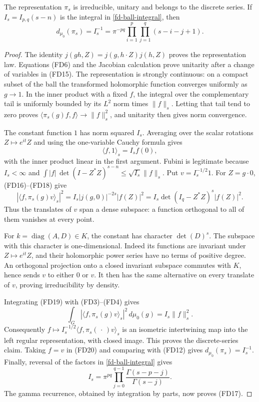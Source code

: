 \begin{lemma}\label{fd-scalar-model}
The representation $\pi_s$ is irreducible, unitary and
belongs to the discrete series. If
$I_s=I_{p,q}(s-n)$ is the integral in
\eqref{fd-ball-integral}, then
\[
                    d_{\mu_0}(\pi_s)=I_s^{-1}
                      =\pi^{-pq}
                        \prod_{i=1}^p\prod_{j=1}^q(s-i-j+1).
 \tag{FD17}\label{fd-scalar-degree}
\]
\end{lemma}
\begin{proof}
The identity
$j(gh,Z)=j(g,h\cdot Z)j(h,Z)$ proves the representation
law. Equations (FD6) and the Jacobian calculation prove
unitarity after a change of variables in (FD15).
The representation is strongly continuous: on a compact
subset of the ball the transformed holomorphic function
converges uniformly as $g\to1$. In the inner product with
a fixed $f$, the integral over the complementary tail is
uniformly bounded by its $L^2$ norm times $\|f\|_s$.
Letting that tail tend to zero proves
$\langle\pi_s(g)f,f\rangle\to\|f\|_s^2$, and unitarity
then gives norm convergence.

The constant function $1$ has norm squared $I_s$.
Averaging over the scalar rotations $Z\mapsto e^{it}Z$
and using the one-variable Cauchy formula gives
\[
                         \langle f,1\rangle_s=I_s f(0),
 \tag{FD18}
\]
with the inner product linear in the first argument.
Fubini is legitimate because $I_s<\infty$ and
$\int|f|\,\det(I-Z^*Z)^{s-n}\le\sqrt{I_s}\|f\|_s$.
Put $v=I_s^{-1/2}1$. For $Z=g\cdot0$, (FD16)--(FD18) give
\[
 |\langle f,\pi_s(g)v\rangle_s|^2
       =I_s|j(g,0)|^{-2s}|f(Z)|^2
       =I_s\det(I_q-Z^*Z)^s|f(Z)|^2.
 \tag{FD19}
\]
Thus the translates of $v$ span a dense subspace: a function
orthogonal to all of them vanishes at every point.

For $k=\operatorname{diag}(A,D)\in K$, the constant
has character $\det(D)^s$. The subspace with this
character is one-dimensional. Indeed its functions
are invariant under $Z\mapsto e^{it}Z$, and their
holomorphic power series have no terms of positive degree.
An orthogonal projection onto a closed invariant
subspace commutes with $K$, hence sends $v$ to either
$0$ or $v$. It then has the same alternative on every
translate of $v$, proving irreducibility by density.

Integrating (FD19) with (FD3)--(FD4) gives
\[
               \int_G|\langle f,\pi_s(g)v\rangle_s|^2\,d\mu_0(g)
                                  =I_s\|f\|_s^2.
 \tag{FD20}
\]
Consequently $f\mapsto I_s^{-1/2}
\langle f,\pi_s(\,\cdot\,)v\rangle_s$ is an isometric
intertwining map into the left regular representation,
with closed image. This proves the discrete-series claim.
Taking $f=v$ in (FD20) and comparing with (FD12) gives
$d_{\mu_0}(\pi_s)=I_s^{-1}$.
Finally, reversal of the factors in
\eqref{fd-ball-integral} gives
\[
 I_s=\pi^{pq}\prod_{j=0}^{q-1}
                       \frac{\Gamma(s-p-j)}{\Gamma(s-j)}.
\]
The gamma recurrence, obtained by integration by parts,
now proves (FD17).
\end{proof}

